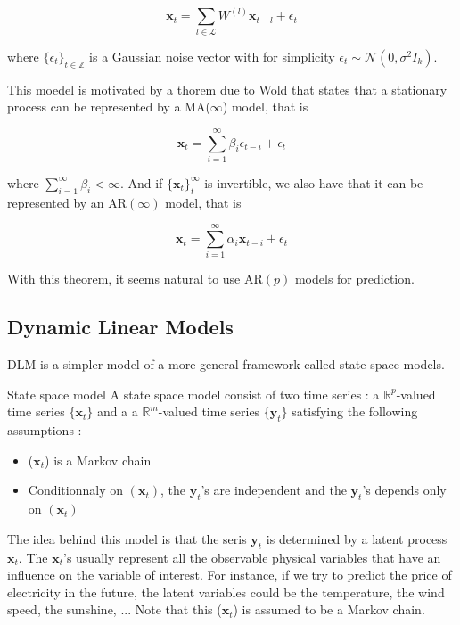 \documentclass{article}
\begin{document}
\begin{equation}
\mathbf{x}_t = \sum_{l \in \mathcal{L}} W^{(l)} \mathbf{x}_{t-l} + \epsilon_t
\label{eq:ar}
\end{equation}

where $\{ \epsilon_t \}_{t \in \mathbb{Z}}$ is a Gaussian noise vector with for simplicity $\epsilon_t \sim \mathcal{N}(0, \sigma^2 I_k)$.

This moedel is motivated by a thorem due to Wold that states that a stationary process can be represented by a MA($\infty$) model, that is

$$\mathbf{x}_t = \sum_{i=1}^{\infty} \beta_i \epsilon_{t-i} + \epsilon_t$$

where $\sum_{i=1}^\infty \beta_i < \infty$. And if $\{ \mathbf{x}_t \}_t^\infty$ is invertible, we also have that it can be represented by an AR$(\infty)$ model, that is

$$\mathbf{x}_t = \sum_{i=1}^{\infty} \alpha_i \mathbf{x}_{t-i} + \epsilon_t$$

With this theorem, it seems natural to use AR$(p)$ models for prediction.

\subsection*{Dynamic Linear Models}
DLM is a simpler model of a more general framework called state space models. \\

\begin{definition}{State space model}
A state space model consist of two time series : a $\mathbb{R}^p$-valued time series $\{\mathbf{x}_t\}$ and a a $\mathbb{R}^m$-valued time series $\{\mathbf{y}_t\}$ satisfying the following assumptions :

\begin{itemize}
        \item ($\mathbf{x}_t$) is a Markov chain
        \item Conditionnaly on $(\mathbf{x}_t)$, the $\mathbf{y}_t$'s are independent and the $\mathbf{y}_t$'s depends only on $(\mathbf{x}_t)$
\end{itemize}
\label{statespace}
\end{definition}

The idea behind this model is that the seris $\mathbf{y}_t$ is determined by a latent process $\mathbf{x}_t$. The $\mathbf{x}_t$'s usually represent all the observable physical variables that have an influence on the variable of interest. For instance, if we try to predict the price of electricity in the future, the latent variables could be the temperature, the wind speed, the sunshine, ... Note that this ($\mathbf{x}_t$) is assumed to be a Markov chain. \\
\end{document}
